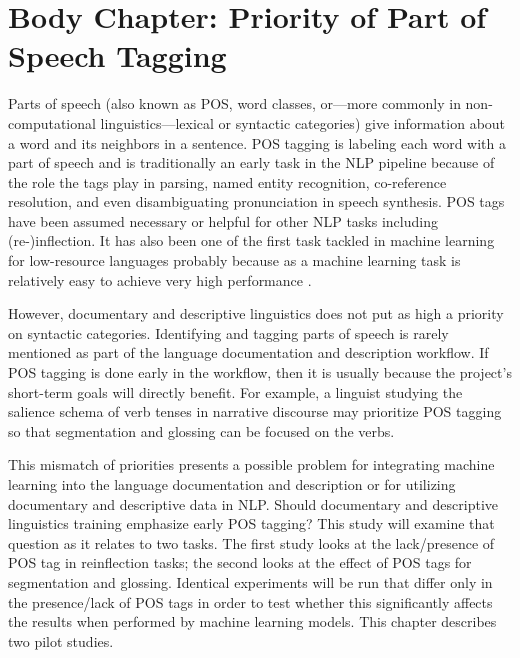 \section{Body Chapter: Priority of Part of Speech Tagging}
\label{sec:POS}

Parts of speech (also known as POS, word classes, or---more commonly in non-computational linguistics---lexical or syntactic categories) give information about a word and its neighbors in a sentence. POS tagging is labeling each word with a part of speech and is traditionally an early task in the NLP pipeline because of the role the tags play in parsing, named entity recognition, co-reference resolution, and even disambiguating pronunciation in speech synthesis. POS tags have been assumed necessary or helpful for other NLP tasks including (re-)inflection. It has also been one of the first task tackled in machine learning for low-resource languages probably because as a machine learning task is relatively easy to achieve very high performance \citep{cox_probabilistic_2010,de_pauw_resource-light_2012,baldridge_learning_2013,duong_natural_2017,anastasopoulos_computational_2019,millour_unsupervised_2019}. 

However, documentary and descriptive linguistics does not put as high a priority on syntactic categories. Identifying and tagging parts of speech is rarely mentioned as part of the language documentation and description workflow. If POS tagging is done early in the workflow, then it is usually because the project's short-term goals will directly benefit. For example, a linguist studying the salience schema of verb tenses in narrative discourse may prioritize POS tagging so that segmentation and glossing can be focused on the verbs. 

This mismatch of priorities presents a possible problem for integrating machine learning into the language documentation and description or for utilizing documentary and descriptive data in NLP. Should documentary and descriptive linguistics training emphasize early POS tagging? 
This study will examine that question as it relates to two tasks. The first study looks at the lack/presence of POS tag in reinflection tasks; the second looks at the effect of POS tags for segmentation and glossing. Identical experiments will be run that differ only in the presence/lack of POS tags in order to test whether this significantly affects the results when performed by machine learning models. This chapter describes two pilot studies. 

